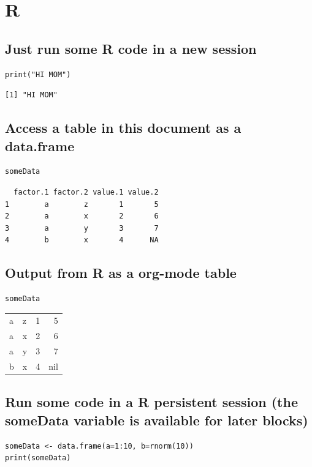 \documentclass[11pt]{article}
\begin{document}
\section{R}
\label{sec:org099cc8d}

\subsection{Just run some R code in a new session}
\label{sec:orgf2a44bb}

\begin{verbatim}
print("HI MOM")
\end{verbatim}

\begin{verbatim}
[1] "HI MOM"
\end{verbatim}

\subsection{Access a table in this document as a data.frame}
\label{sec:orgdefcd96}

\begin{verbatim}
someData
\end{verbatim}

\begin{verbatim}
  factor.1 factor.2 value.1 value.2
1        a        z       1       5
2        a        x       2       6
3        a        y       3       7
4        b        x       4      NA
\end{verbatim}

\subsection{Output from R as a org-mode table}
\label{sec:org979f422}

\begin{verbatim}
someData
\end{verbatim}

\begin{center}
\begin{tabular}{llrr}
a & z & 1 & 5\\
a & x & 2 & 6\\
a & y & 3 & 7\\
b & x & 4 & nil\\
\end{tabular}
\end{center}

\subsection{Run some code in a R persistent session (the someData variable is available for later blocks)}
\label{sec:org1b86d59}
\begin{verbatim}
someData <- data.frame(a=1:10, b=rnorm(10))
print(someData)
\end{verbatim}
\end{document}
